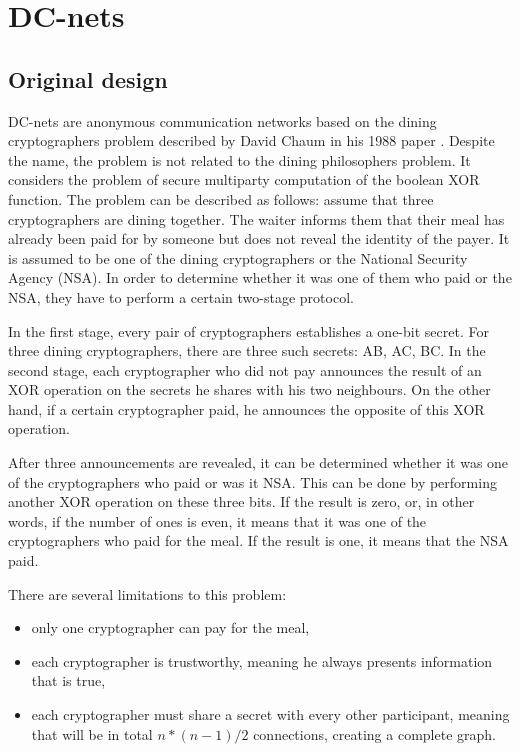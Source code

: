 \section{DC-nets}

\subsection{Original design}
DC-nets are anonymous communication networks based on the dining cryptographers problem described by David Chaum in his 1988 paper \cite{dc-nets}. Despite the name, the problem is not related to the dining philosophers problem. It considers the problem of secure multiparty computation of the boolean XOR function. 
The problem can be described as follows: assume that three cryptographers are dining together. The waiter informs them that their meal has already been paid for by someone but does not reveal the identity of the payer. It is assumed to be one of the dining cryptographers or the National Security Agency (NSA). In order to determine whether it was one of them who paid or the NSA, they have to perform a certain two-stage protocol.

In the first stage, every pair of cryptographers establishes a one-bit secret. For three dining cryptographers, there are three such secrets: AB, AC, BC.
In the second stage, each cryptographer who did not pay announces the result of an XOR operation on the secrets he shares with his two neighbours. On the other hand, if a certain cryptographer paid, he announces the opposite of this XOR operation.

After three announcements are revealed, it can be determined whether it was one of the cryptographers who paid or was it NSA. This can be done by performing another XOR operation on these three bits. If the result is zero, or, in other words, if the number of ones is even, it means that it was one of the cryptographers who paid for the meal. If the result is one, it means that the NSA paid.

There are several limitations to this problem:
\begin{itemize}
    \item only one cryptographer can pay for the meal,
    \item each cryptographer is trustworthy, meaning he always presents information that is true,
    \item each cryptographer must share a secret with every other participant, meaning that will be in total $n * (n-1) / 2$ connections, creating a complete graph.
\end{itemize}

